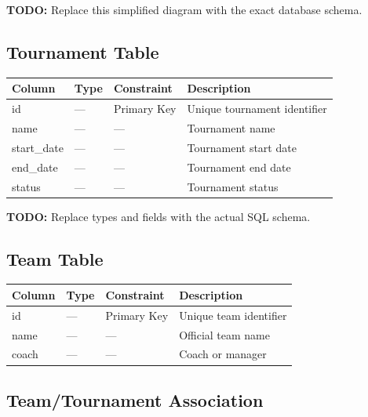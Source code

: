 \documentclass[12pt,a4paper]{article}
\begin{document}
\textbf{TODO:} Replace this simplified diagram with the exact
database schema.


\subsection{Tournament Table}

\begin{longtable}{llll}
\toprule
\textbf{Column} & \textbf{Type} & \textbf{Constraint} & \textbf{Description}\\
\midrule
id & --- & Primary Key & Unique tournament identifier\\
name & --- & --- & Tournament name\\
start\_date & --- & --- & Tournament start date\\
end\_date & --- & --- & Tournament end date\\
status & --- & --- & Tournament status\\
\bottomrule
\end{longtable}

\textbf{TODO:} Replace types and fields with the actual SQL schema.


\subsection{Team Table}

\begin{longtable}{llll}
\toprule
\textbf{Column} & \textbf{Type} & \textbf{Constraint} & \textbf{Description}\\
\midrule
id & --- & Primary Key & Unique team identifier\\
name & --- & --- & Official team name\\
coach & --- & --- & Coach or manager\\
\bottomrule
\end{longtable}


\subsection{Team/Tournament Association}
\end{document}
